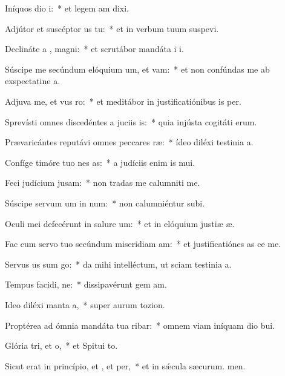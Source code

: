 \item Iníquos dio i:~* et legem am dixi.
\item Adjútor et suscéptor us  tu:~* et in verbum tuum suspevi.
\item Declináte a , magni:~* et scrutábor mandáta i i.
\item Súscipe me secúndum elóquium um, et vam:~* et non confúndas me ab exspectatine a.
\item Adjuva me, et vus ro:~* et meditábor in justificatiónibus is per.
\item Sprevísti omnes discedéntes a juciis is:~* quia injústa cogitáti erum.
\item Prævaricántes reputávi omnes peccares ræ:~* ídeo diléxi testinia a.
\item Confíge timóre tuo nes as:~* a judíciis enim is mui.
\item Feci judícium  jusam:~* non tradas me calumniti me.
\item Súscipe servum um in num:~* non calumniéntur  subi.
\item Oculi mei defecérunt in salure um:~* et in elóquium justiæ æ.
\item Fac cum servo tuo secúndum miseridiam am:~* et justificatiónes as ce me.
\item Servus us sum go:~* da mihi intelléctum, ut sciam testinia a.
\item Tempus facidi, ne:~* dissipavérunt gem am.
\item Ideo diléxi manta a,~* super aurum  tozion.
\item Proptérea ad ómnia mandáta tua ribar:~* omnem viam iníquam dio bui.
\item Glória tri, et o,~* et Spitui to.
\item Sicut erat in princípio, et , et per,~* et in sǽcula sæcurum. men.
